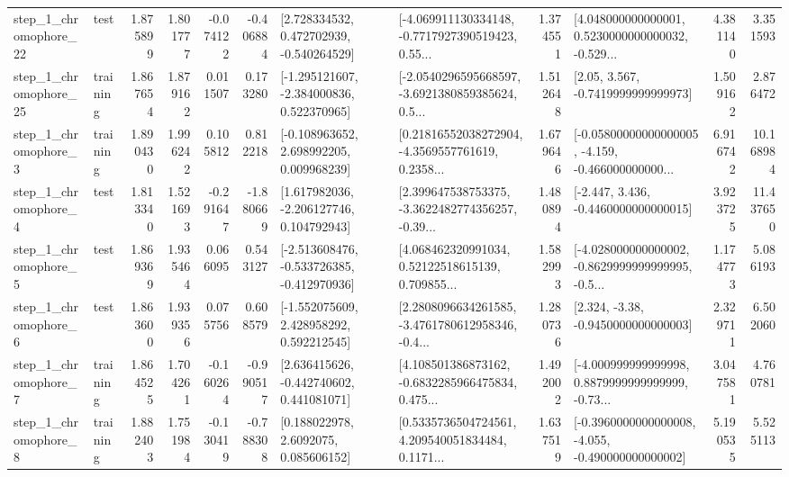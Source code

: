 \begin{tabular}{llrrrrllrlrr}
    step\_1\_chromophore\_22 &      test &      1.875899 &    1.801777 &     -0.074122 & -0.406884 &    [2.728334532, 0.472702939, -0.540264529] &  [-4.069911130334148, -0.7717927390519423, 0.55... &       1.374551 &  [4.048000000000001, 0.5230000000000032, -0.529... &            4.381140 &          3.351593 \\
    step\_1\_chromophore\_25 &  training &      1.867654 &    1.879162 &      0.011507 &  0.173280 &   [-1.295121607, -2.384000836, 0.522370965] &  [-2.0540296595668597, -3.6921380859385624, 0.5... &       1.512648 &                 [2.05, 3.567, -0.7419999999999973] &            1.509162 &          2.876472 \\
     step\_1\_chromophore\_3 &  training &      1.890430 &    1.996242 &      0.105812 &  0.812218 &    [-0.108963652, 2.698992205, 0.009968239] &  [0.21816552038272904, -4.3569557761619, 0.2358... &       1.679646 &  [-0.05800000000000005, -4.159, -0.466000000000... &            6.916742 &         10.168984 \\
     step\_1\_chromophore\_4 &      test &      1.813340 &    1.521693 &     -0.291647 & -1.880669 &    [1.617982036, -2.206127746, 0.104792943] &  [2.399647538753375, -3.3622482774356257, -0.39... &       1.480894 &               [-2.447, 3.436, -0.4460000000000015] &            3.923725 &         11.437650 \\
     step\_1\_chromophore\_5 &      test &      1.869369 &    1.935464 &      0.066095 &  0.543127 &  [-2.513608476, -0.533726385, -0.412970936] &  [4.068462320991034, 0.52122518615139, 0.709855... &       1.582993 &  [-4.028000000000002, -0.8629999999999995, -0.5... &            1.174773 &          5.086193 \\
     step\_1\_chromophore\_6 &      test &      1.863600 &    1.939356 &      0.075756 &  0.608579 &    [-1.552075609, 2.428958292, 0.592212545] &  [2.2808096634261585, -3.4761780612958346, -0.4... &       1.280736 &                [2.324, -3.38, -0.9450000000000003] &            2.329711 &          6.502060 \\
     step\_1\_chromophore\_7 &  training &      1.864525 &    1.704261 &     -0.160264 & -0.990517 &    [2.636415626, -0.442740602, 0.441081071] &  [4.108501386873162, -0.6832285966475834, 0.475... &       1.492002 &  [-4.000999999999998, 0.8879999999999999, -0.73... &            3.047581 &          4.760781 \\
     step\_1\_chromophore\_8 &  training &      1.882403 &    1.751984 &     -0.130419 & -0.788308 &       [0.188022978, 2.6092075, 0.085606152] &  [0.5335736504724561, 4.209540051834484, 0.1171... &       1.637519 &  [-0.3960000000000008, -4.055, -0.490000000000002] &            5.190535 &          5.525113 \\

\end{tabular}
